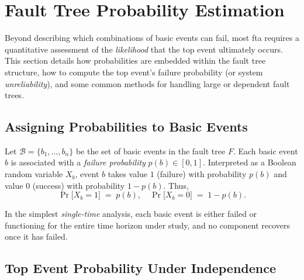 \section{Fault Tree Probability Estimation}
\label{sec:fault_tree_probability_estimation}

Beyond describing which combinations of basic events can fail, most \acrfull{fta} requires a quantitative assessment of the \emph{likelihood} that the top event ultimately occurs. This section details how probabilities are embedded within the fault tree structure, how to compute the top event’s failure probability (or system \emph{unreliability}), and some common methods for handling large or dependent fault trees.

\subsection{Assigning Probabilities to Basic Events}

Let \(\mathcal{B}=\{b_1, \dots, b_n\}\) be the set of basic events in the fault tree \(F\).  Each basic event \(b\) is associated with a \emph{failure probability} \(p(b)\in [0,1]\).  Interpreted as a Boolean random variable \(X_b\), event \(b\) takes value \(1\) (failure) with probability \(p(b)\) and value \(0\) (success) with probability \(1-p(b)\).  Thus, 
\[
\Pr\bigl[X_b = 1\bigr] \;=\; p(b), 
\quad
\Pr\bigl[X_b = 0\bigr] \;=\; 1-p(b).
\]

In the simplest \emph{single-time} analysis, each basic event is either failed or functioning for the entire time horizon under study, and no component recovers once it has failed.

\subsection{Top Event Probability Under Independence}

